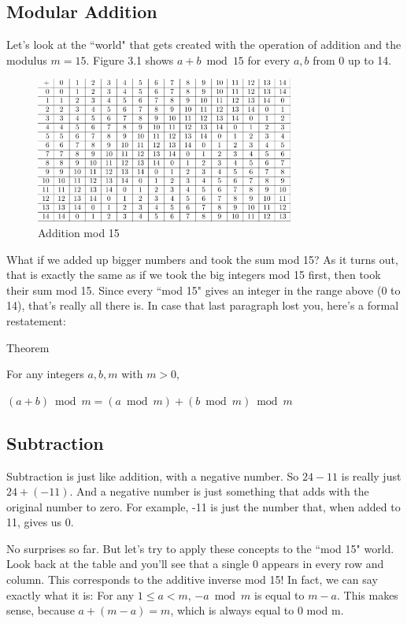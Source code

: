 \documentclass{report}
\begin{document}
\subsection{Modular Addition}
Let's look at the ``world" that gets created with the operation of addition and the modulus \(m=15\). Figure 3.1 shows \(a+b\bmod 15\) for every \(a,b\) from 0 up to 14.

\begin{figure}[!ht]
  \centering
  \includegraphics[width=85mm,scale=0.5]{s15.png}
  \caption{Addition mod 15}
\end{figure}


What if we added up bigger numbers and took the sum mod 15? As it turns out, that is exactly the same as if we took the big integers mod 15 first, then took their sum mod 15. Since every ``mod 15" gives an integer in the range above (0 to 14), that's really all there is.
\newline
\newline
In case that last paragraph lost you, here's a formal restatement:

Theorem

For any integers \(a,b,m\) with \(m > 0\),

\((a + b) \bmod m = (a \bmod m) + (b \bmod m) \bmod m\)

\subsection{Subtraction}

Subtraction is just like addition, with a negative number. So \(24 - 11\) is really just \(24 + (-11)\). And a negative number is just something that adds with the original number to zero. For example, -11 is just the number that, when added to 11, gives us 0.

No surprises so far. But let's try to apply these concepts to the ``mod 15" world. 
Look back at the table and you'll see that a single 0 appears in every row and column. 
This corresponds to the additive inverse mod 15! In fact, we can say exactly what it is: For any \(1\leq a < m\), \(-a\bmod m\) is equal to \(m-a\). This makes sense, because \(a+(m-a)=m\), which is always equal to 0 mod m.
\end{document}

